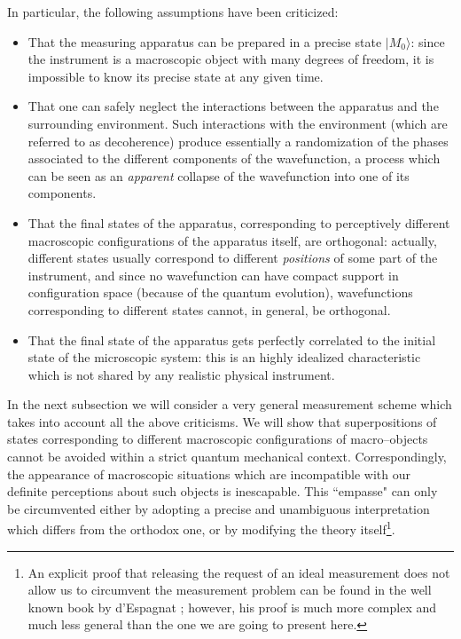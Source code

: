 \documentclass[10pt,a4paper]{article}
\begin{document}
In particular, the following assumptions have been criticized:
\begin{itemize}
\item That the measuring apparatus can be prepared in a
precise state $|M_{0}\rangle$: since the instrument is a
macroscopic object with many degrees of freedom, it is impossible
to know its precise state at any given time.

\item That one can safely neglect the interactions between the
apparatus and the surrounding environment. Such interactions with
the environment (which are referred to as decoherence) produce
essentially a randomization of the phases associated to the
different components of the wavefunction, a process which can be
seen as an {\it apparent} collapse of the  wavefunction into one
of its components.

\item  That the final states of the apparatus, corresponding to
perceptively different macroscopic configurations of the apparatus
itself, are orthogonal: actually, different states usually
correspond to different {\it positions} of some part of the
instrument, and since no wavefunction can have compact support in
configuration space (because of the quantum evolution),
wavefunctions corresponding to different states cannot, in
general, be orthogonal.

\item That the final state of the apparatus gets perfectly
correlated to the initial state of the microscopic system: this is
an highly idealized characteristic which is not shared by any
realistic physical instrument.

\end{itemize}

In the next subsection we will consider a very general measurement
scheme \cite{bg1} which takes into account all the above
criticisms. We will show that superpositions of states
corresponding to different macroscopic configurations of
macro--objects cannot be avoided within a strict quantum
mechanical context. Correspondingly, the appearance of macroscopic
situations which are incompatible with our definite perceptions
about such objects is inescapable. This ``empasse" can only be
circumvented either by adopting a precise and unambiguous
interpretation which differs from the  orthodox one, or by
modifying the theory itself\footnote{An explicit  proof that
releasing the request of an ideal measurement does not allow us to
circumvent the measurement problem  can be found in the well known
book by d'Espagnat \cite{de}; however, his proof is much more
complex and much  less general than the one we are going to
present here.}.
\end{document}
